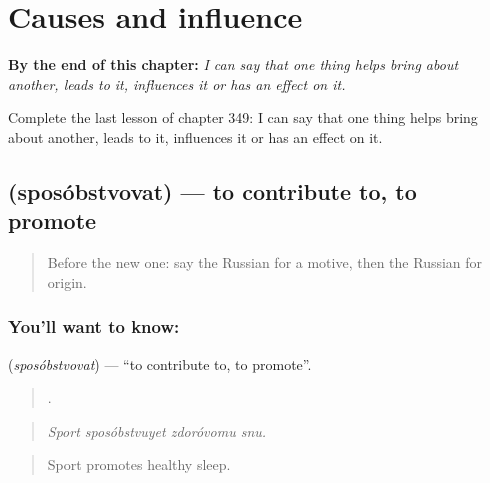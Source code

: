 
\chapter{Causes and influence}
\label{ch:ru-causes-and-influence}

\begin{chapteropening}
\textbf{By the end of this chapter:} \emph{I can say that one thing helps bring about another, leads to it, influences it or has an effect on it.}

Complete the last lesson of chapter 349: I can say that one thing helps bring about another, leads to it, influences it or has an effect on it.
\end{chapteropening}

\section[\texorpdfstring{\ru{способствовать} (sposóbstvovat)}{способствовать (sposóbstvovat)}]{ (sposóbstvovat) — to contribute to, to promote}

\label{lesson:RU-C349-sposobstvovat}



\begin{quote}
Before the new one: say the Russian for a motive, then the Russian for origin.
\end{quote}

\subsection*{You'll want to know: }
\textbf{} (\emph{sposóbstvovat}) — \textquotedblleft{}to contribute to, to promote\textquotedblright{}.

\begin{quote}
   .
\end{quote}

\begin{quote}
\emph{Sport sposóbstvuyet zdoróvomu snu.}
\end{quote}

\begin{quote}
Sport promotes healthy sleep.
\end{quote}

